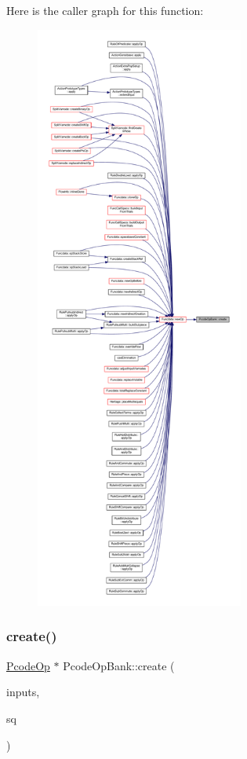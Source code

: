 Here is the caller graph for this function\+:
\nopagebreak
\begin{figure}[H]
\begin{center}
\leavevmode
\includegraphics[height=550pt]{class_pcode_op_bank_a99a5d552174bddb89036c1755708b9aa_icgraph}
\end{center}
\end{figure}
\mbox{\label{class_pcode_op_bank_a472c7fb8eea24665358e78977bc73245}} 
\subsubsection{\texorpdfstring{create()}{create()}\hspace{0.1cm}{\footnotesize\ttfamily [2/2]}}
{\footnotesize\ttfamily \mbox{\hyperlink{class_pcode_op}{Pcode\+Op}} $\ast$ Pcode\+Op\+Bank\+::create (\begin{DoxyParamCaption}\item[{int4}]{inputs,  }\item[{const \mbox{\hyperlink{class_seq_num}{Seq\+Num}} \&}]{sq }\end{DoxyParamCaption})}



